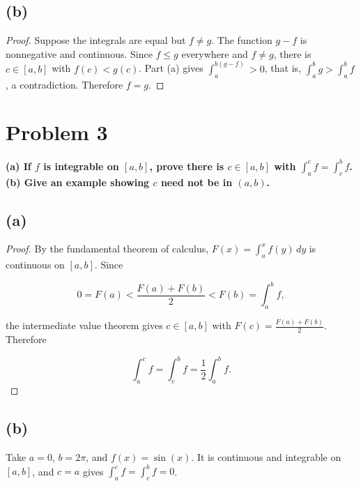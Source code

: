 \subsection{(b)}

\begin{proof}

Suppose the integrals are equal but \(f \neq g\). The function \(g - f\) is nonnegative and continuous. Since \(f \leq g\) everywhere and \(f \neq g\), there is \(c \in \left\lbrack {a,b} \right\rbrack\) with \(f(c) < g(c)\). Part (a) gives \(\int_{a}^{b{({g - f})}} > 0\), that is, \(\int_{a}^{b}g > \int_{a}^{b}f\), a contradiction. Therefore \(f = g\).

\end{proof}

\section{Problem 3}

\textbf{(a) If \(f\) is integrable on \(\left\lbrack {a,b} \right\rbrack\), prove there is \(c \in \left\lbrack {a,b} \right\rbrack\) with \(\int_{a}^{c}f = \int_{c}^{b}f\). (b) Give an example showing \(c\) need not be in \(\left( {a,b} \right)\).}

\subsection{(a)}

\begin{proof}

By the fundamental theorem of calculus, \(F(x) = \int_{a}^{x}f(y)\, dy\) is continuous on \(\left\lbrack {a,b} \right\rbrack\). Since

\[0 = F(a) < \frac{F(a) + F(b)}{2} < F(b) = \int_{a}^{b}f,\]

the intermediate value theorem gives \(c \in \left\lbrack {a,b} \right\rbrack\) with \(F(c) = \frac{F(a) + F(b)}{2}\). Therefore

\[\int_{a}^{c}f = \int_{c}^{b}f = \frac{1}{2}\int_{a}^{b}f.\]

\end{proof}

\subsection{(b)}

Take \(a = 0\), \(b = 2\pi\), and \(f(x) = \sin(x)\). It is continuous and integrable on \(\left\lbrack {a,b} \right\rbrack\), and \(c = a\) gives \(\int_{a}^{c}f = \int_{c}^{b}f = 0\).

